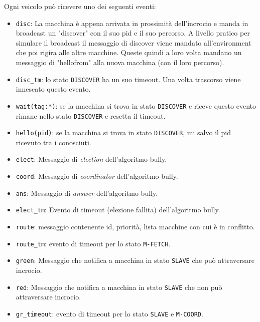 \documentclass{memoir}
\begin{document}
Ogni veicolo può ricevere uno dei seguenti eventi:
\begin{itemize}
\item \texttt{disc}: La macchina è appena arrivata in prossimità dell'incrocio e
  manda in broadcast un "discover" con il suo pid e il suo percorso. A livello
  pratico per simulare il broadcast il messaggio di discover viene mandato
  all'environment che poi rigira alle altre macchine. Queste quindi a loro volta
  mandano un messaggio di "hellofrom" alla nuova macchina (con il loro
  percorso).
\item \texttt{disc\_tm}: lo stato \texttt{DISCOVER} ha un suo timeout. Una volta
  trascorso viene innescato questo evento.
\item \texttt{wait(tag:*)}: se la macchina si trova in stato \texttt{DISCOVER} e
  riceve questo evento rimane nello stato \texttt{DISCOVER} e resetta il
  timeout.
\item \texttt{hello(pid)}: se la macchina si trova in stato \texttt{DISCOVER},
  mi salvo il pid ricevuto tra i conosciuti.
\item \texttt{elect}: Messaggio di \emph{election} dell'algoritmo bully.
\item \texttt{coord}: Messaggio di \emph{coordinator} dell'algoritmo bully.
\item \texttt{ans}: Messaggio di \emph{answer} dell'algoritmo bully.
\item \texttt{elect\_tm}: Evento di timeout (elezione fallita) dell'algoritmo bully.
\item \texttt{route}: messaggio contenente id, priorità, lista macchine con cui
  è in conflitto.
\item \texttt{route\_tm}: evento di timeout per lo stato \texttt{M-FETCH}.
\item \texttt{green}: Messaggio che notifica a macchina in stato \texttt{SLAVE}
  che può attraversare incrocio.
\item \texttt{red}: Messaggio che notifica a macchina in stato \texttt{SLAVE}
  che non può attraversare incrocio.
\item \texttt{gr\_timeout}: evento di timeout per lo stato \texttt{SLAVE} e
  \texttt{M-COORD}.
\end{itemize}
\end{document}
